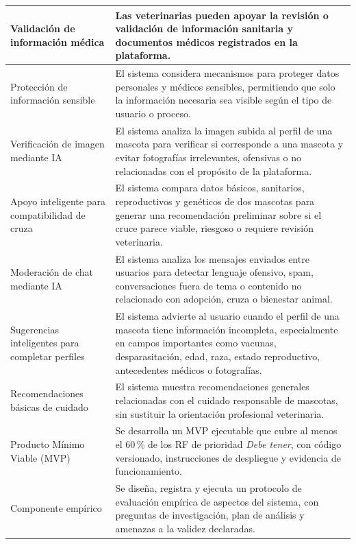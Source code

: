 \documentclass[journal,onecolumn]{IEEEtran}
\begin{document}
\begin{longtable}{|p{4cm}|p{11cm}|}
		\hline
		Validación de información médica & Las veterinarias pueden apoyar la revisión o validación de información sanitaria y documentos médicos registrados en la plataforma. \\
		\hline
		Protección de información sensible & El sistema considera mecanismos para proteger datos personales y médicos sensibles, permitiendo que solo la información necesaria sea visible según el tipo de usuario o proceso. \\
		\hline
		Verificación de imagen mediante IA & El sistema analiza la imagen subida al perfil de una mascota para verificar si corresponde a una mascota y evitar fotografías irrelevantes, ofensivas o no relacionadas con el propósito de la plataforma. \\
		\hline
		Apoyo inteligente para compatibilidad de cruza & El sistema compara datos básicos, sanitarios, reproductivos y genéticos de dos mascotas para generar una recomendación preliminar sobre si el cruce parece viable, riesgoso o requiere revisión veterinaria. \\
		\hline
		Moderación de chat mediante IA & El sistema analiza los mensajes enviados entre usuarios para detectar lenguaje ofensivo, spam, conversaciones fuera de tema o contenido no relacionado con adopción, cruza o bienestar animal. \\
		\hline
		Sugerencias inteligentes para completar perfiles & El sistema advierte al usuario cuando el perfil de una mascota tiene información incompleta, especialmente en campos importantes como vacunas, desparasitación, edad, raza, estado reproductivo, antecedentes médicos o fotografías. \\
		\hline
		Recomendaciones básicas de cuidado & El sistema muestra recomendaciones generales relacionadas con el cuidado responsable de mascotas, sin sustituir la orientación profesional veterinaria. \\
		\hline
		Producto Mínimo Viable (MVP) & Se desarrolla un MVP ejecutable que cubre al menos el 60\,\% de los RF de prioridad \emph{Debe tener}, con código versionado, instrucciones de despliegue y evidencia de funcionamiento. \\
		\hline
		Componente empírico & Se diseña, registra y ejecuta un protocolo de evaluación empírica de aspectos del sistema, con preguntas de investigación, plan de análisis y amenazas a la validez declaradas. \\
		\hline
	\end{longtable}
	
\end{document}
